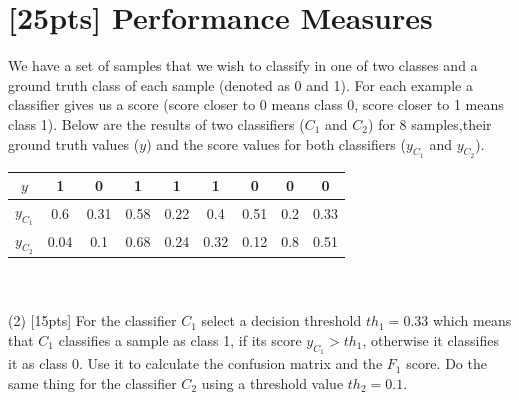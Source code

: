 \documentclass{article}
\begin{document}
	\section{[25pts] Performance Measures}
	We have a set of samples that we wish to classify in one of two classes and a ground truth class of each sample (denoted as 0 and 1). For each example a classifier gives us a score (score closer to 0 means class 0, score closer to 1 means class 1). Below are the results of two classifiers ($C_1$ and $C_2$) for 8 samples,their ground truth values ($y$) and the score values for both classifiers ($y_{C_1}$ and $y_{C_2}$).
	\begin{table}[htbp]
		\centering
		\begin{tabular}{c|cccccccc}
			\hline
			$y$ & 1 & 0 & 1 & 1 & 1 & 0 & 0 & 0\\
			\hline
			$y_{C_1}$ & 0.6 & 0.31 & 0.58 & 0.22 & 0.4 & 0.51 & 0.2 & 0.33\\
			\hline
			$y_{C_2}$ & 0.04 & 0.1 & 0.68 & 0.24 & 0.32 & 0.12 & 0.8 & 0.51\\
			\hline
		\end{tabular}
	\end{table}
	
	\\\\
	(2) [15pts] For the classifier $C_1$ select a decision threshold $th_1 = 0.33$ which means that $C_1$ classifies a sample as class 1, if its score $y_{C_1} > th_1$, otherwise it classifies it as class 0. Use it to calculate the confusion matrix and the $F_1$ score. Do the same thing for the classifier $C_2$ using a threshold value $th_2 = 0.1$.\\\\
	
\end{document}
